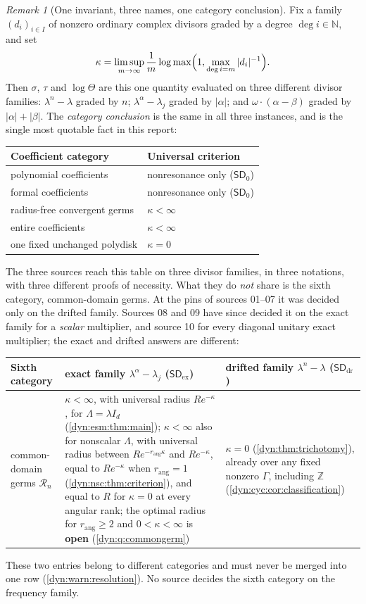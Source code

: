 \documentclass[11pt,letterpaper]{article}
\theoremstyle{definition}
\theoremstyle{remark}
\newtheorem{remark}[remark]{Remark}
\newcommand{\Z}{\mathbb Z}
\newcommand{\N}{\mathbb N}
\newcommand{\sdz}{\mathsf{SD}_{0}}
\newcommand{\sddr}{\mathsf{SD}_{\mathrm{dr}}}
\newcommand{\sdex}{\mathsf{SD}_{\mathrm{ex}}}
\newcommand{\rang}{r_{\mathrm{ang}}}
\numberwithin{equation}{section}
\begin{document}
\begin{remark}[One invariant, three names, one category conclusion]
\label{dyn:rem:oneinvariant}
Fix a family $(d_i)_{i\in I}$ of nonzero ordinary complex divisors graded
by a degree $\deg i\in\N$, and set
\[
 \kappa=\limsup_{m\to\infty}\frac1m
 \log\max\Bigl(1,\max_{\deg i=m}|d_i|^{-1}\Bigr).
\]
Then $\sigma$, $\tau$ and $\log\Theta$ are this one quantity evaluated on
three different divisor families: $\lambda^{n}-\lambda$ graded by $n$;
$\lambda^{\alpha}-\lambda_j$ graded by $|\alpha|$; and
$\omega\cdot(\alpha-\beta)$ graded by $|\alpha|+|\beta|$. The
\emph{category conclusion} is the same in all three instances, and is the
single most quotable fact in this report:
\begin{center}
\begin{tabular}{@{}ll@{}}
\toprule
Coefficient category & Universal criterion\\
\midrule
polynomial coefficients & nonresonance only ($\sdz$)\\
formal coefficients & nonresonance only ($\sdz$)\\
radius-free convergent germs & $\kappa<\infty$\\
entire coefficients & $\kappa<\infty$\\
one fixed unchanged polydisk & $\kappa=0$\\
\bottomrule
\end{tabular}
\end{center}
The three sources reach this table on three divisor families, in three
notations, with three different proofs of necessity. What they do
\emph{not} share is the sixth category, common-domain germs. At the pins of
sources 01--07 it was decided only on the drifted family. Sources 08 and 09
have since decided it on the exact family for a \emph{scalar} multiplier,
and source 10 for every diagonal unitary exact multiplier; the exact and
drifted answers are different:
\begin{center}
\begin{tabular}{@{}P{0.25\textwidth}P{0.36\textwidth}P{0.30\textwidth}@{}}
\toprule
Sixth category & exact family $\lambda^{\alpha}-\lambda_j$ ($\sdex$)
& drifted family $\lambda^{n}-\lambda$ ($\sddr$)\\
\midrule
common-domain germs $\mathcal R_n$
& $\kappa<\infty$, with universal radius $Re^{-\kappa}$, for
 $\Lambda=\lambda I_d$ (\cref{dyn:esm:thm:main}); $\kappa<\infty$ also for
 nonscalar $\Lambda$, with universal radius between $Re^{-\rang\kappa}$
 and $Re^{-\kappa}$, equal to $Re^{-\kappa}$ when $\rang=1$
 (\cref{dyn:nsc:thm:criterion}), and equal to $R$ for $\kappa=0$ at every
 angular rank; the optimal radius for $\rang\ge2$ and $0<\kappa<\infty$ is
 \textbf{open} (\cref{dyn:q:commongerm})
& $\kappa=0$ (\cref{dyn:thm:trichotomy}), already over any fixed nonzero
 $\Gamma$, including $\Z$ (\cref{dyn:cyc:cor:classification})\\
\bottomrule
\end{tabular}
\end{center}
These two entries belong to different categories and must never be merged
into one row (\cref{dyn:warn:resolution}). No source decides the sixth
category on the frequency family.


\end{remark}
\end{document}
